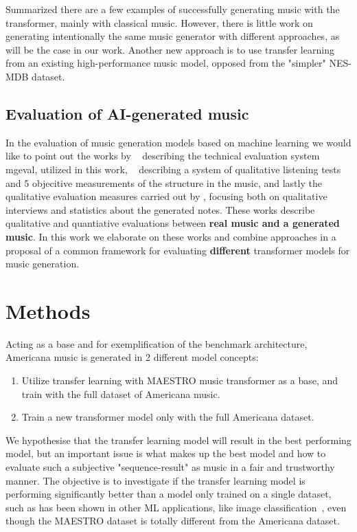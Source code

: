 \documentclass{IEEEtran}
\begin{document}
Summarized there are a few examples of successfully generating music with the transformer,
mainly with classical music. However, there is little work on 
generating intentionally the same music generator with different approaches, 
as will be the case in our work. Another new approach is to use transfer
learning from an existing high-performance music model, opposed from the 
"simpler" NES-MDB dataset.

\subsection{Evaluation of AI-generated music}

In the evaluation of music generation models based on machine learning we would like to point out the
works by \citeauthor{yang2020evaluation}~\cite{yang2020evaluation} describing the technical 
evaluation system mgeval, utilized in this work,
\citeauthor{wu2020jazz}~\cite{wu2020jazz} describing a system of qualitative listening 
tests and 5 objecitive measurements of the structure in the music, and lastly the qualitative 
evaluation measures carried out by \citeauthor{sturm2017taking}
\cite{sturm2017taking}, focusing both on qualitative interviews and statistics about the 
generated notes. These works describe qualitative and quantiative evaluations
between \textbf{real music and a generated music}. In this work we elaborate
on these works and combine approaches in a proposal of a common framework for evaluating
\textbf{different} transformer models for music generation.

\section{Methods}

Acting as a base and for exemplification of the benchmark architecture,
Americana music is generated in 2 different model concepts:
\begin{enumerate}
    \item Utilize transfer learning with MAESTRO music transformer as a base,
        and train with the full dataset of Americana music.
    \item Train a new transformer model only with the full
        Americana dataset.
\end{enumerate}

We hypothesise that the transfer learning model will result in the best
performing
model, but an important issue is what makes up the best model and how to
evaluate such a subjective "sequence-result" as music in a fair and
trustworthy manner. The objective is to investigate if the transfer learning 
model is performing significantly better than a model only trained on
a single dataset, such as has been shown in other ML applications, like image
classification~\cite{7404017}, even though the MAESTRO dataset is totally
different from the Americana dataset.
\end{document}
